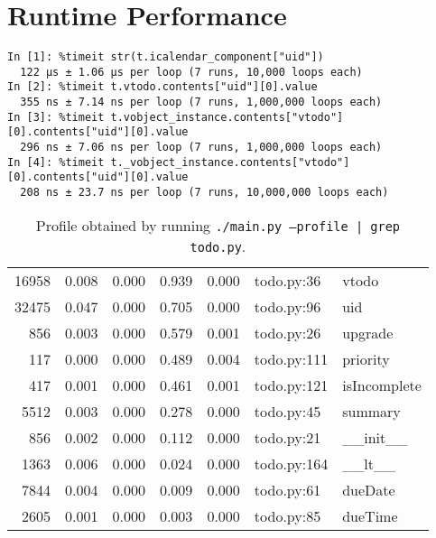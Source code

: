 \documentclass{prettytex/ox/mmsc-special-topic}
\begin{document}
  \section{Runtime Performance}
  \begin{verbatim}
In [1]: %timeit str(t.icalendar_component["uid"])
  122 µs ± 1.06 µs per loop (7 runs, 10,000 loops each)
In [2]: %timeit t.vtodo.contents["uid"][0].value
  355 ns ± 7.14 ns per loop (7 runs, 1,000,000 loops each)
In [3]: %timeit t.vobject_instance.contents["vtodo"][0].contents["uid"][0].value
  296 ns ± 7.06 ns per loop (7 runs, 1,000,000 loops each)
In [4]: %timeit t._vobject_instance.contents["vtodo"][0].contents["uid"][0].value
  208 ns ± 23.7 ns per loop (7 runs, 10,000,000 loops each)
  \end{verbatim}

  \begin{table}[H]
    \centering
    \caption{Profile obtained by running \texttt{./main.py --profile | grep todo.py}.}
    \begin{tabular}{rrrrrll}
      16958 & 0.008 & 0.000 & 0.939 & 0.000 & todo.py:36  & vtodo        \\
      32475 & 0.047 & 0.000 & 0.705 & 0.000 & todo.py:96  & uid          \\
      856   & 0.003 & 0.000 & 0.579 & 0.001 & todo.py:26  & upgrade      \\
      117   & 0.000 & 0.000 & 0.489 & 0.004 & todo.py:111 & priority     \\
      417   & 0.001 & 0.000 & 0.461 & 0.001 & todo.py:121 & isIncomplete \\
      5512  & 0.003 & 0.000 & 0.278 & 0.000 & todo.py:45  & summary      \\
      856   & 0.002 & 0.000 & 0.112 & 0.000 & todo.py:21  & \_\_init\_\_ \\
      1363  & 0.006 & 0.000 & 0.024 & 0.000 & todo.py:164 & \_\_lt\_\_   \\
      7844  & 0.004 & 0.000 & 0.009 & 0.000 & todo.py:61  & dueDate      \\
      2605  & 0.001 & 0.000 & 0.003 & 0.000 & todo.py:85  & dueTime      \\
    \end{tabular}
  \end{table}

  \pagebreak
  \printbibliography
  \printnoidxglossary[type=acronym]

\end{document}
